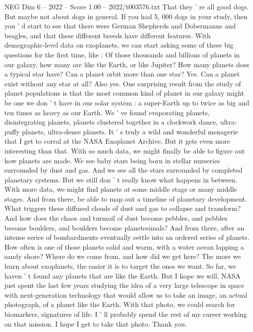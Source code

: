 \begin{textsample}{NEG Dim 6 – 2022 – Score 1.00 – 2022/t003576.txt}
That they ' re all good dogs.
But maybe not about dogs in general.
If you had 5, 000 dogs in your study, then you ' d start to see that there were German Shepherds and Dobermanns and beagles, and that these different breeds have different features.
With demographic-level data on exoplanets, we can start asking some of these big questions for the first time, like : Of those thousands and billions of planets in our galaxy, how many are like the Earth, or like Jupiter?
How many planets does a typical star have?
Can a planet orbit more than one star?
Yes.
Can a planet exist without any star at all?
Also yes.
One surprising result from the study of planet populations is that the most common kind of planet in our galaxy might be one we don ' t have in our solar system : a super-Earth up to twice as big and ten times as heavy as our Earth.
We ' ve found evaporating planets, disintegrating planets, planets clustered together in a clockwork dance, ultra-puffy planets, ultra-dense planets.
It ' s truly a wild and wonderful menagerie that I get to corral at the NASA Exoplanet Archive.
But it gets even more interesting than that.
With so much data, we might finally be able to figure out how planets are made.
We see baby stars being born in stellar nurseries surrounded by dust and gas.
And we see all the stars surrounded by completed planetary systems.
But we still don ' t really know what happens in between.
With more data, we might find planets at some middle stage or many middle stages.
And from there, be able to map out a timeline of planetary development.
What triggers these diffused clouds of dust and gas to collapse and transform?
And how does the chaos and turmoil of dust become pebbles, and pebbles become boulders, and boulders become planetesimals?
And from there, after an intense series of bombardments eventually settle into an ordered series of planets.
How often is one of those planets solid and warm, with a water ocean lapping a sandy shore?
Where do we come from, and how did we get here?
The more we learn about exoplanets, the easier it is to target the ones we want.
So far, we haven ' t found any planets that are like the Earth.
But I hope we will.
NASA just spent the last few years studying the idea of a very large telescope in space with next-generation technology that would allow us to take an image, an actual photograph, of a planet like the Earth.
With that photo, we could search for biomarkers, signatures of life.
I ' ll probably spend the rest of my career working on that mission.
I hope I get to take that photo.
Thank you.

\end{textsample}
